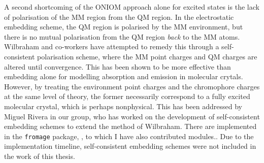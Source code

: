 A second shortcoming of the ONIOM approach alone for excited states is the lack of polarisation of the MM region from the QM region. In the electrostatic embedding scheme, the QM region is polarised by the MM environment, but there is no mutual polarisation from the QM region \textit{back} to the MM atoms. Wilbraham and co-workers have attempted to remedy this through a self-consistent polarisation scheme, where the MM point charges and QM charges are altered until convergence.\cite{Wilbraham2016} This has been shown to be more effective than embedding alone for modelling absorption and emission in molecular crytals.\cite{Presti2017a,Wilbraham2018a} However, by treating the environment point charges and the chromophore charges at the same level of theory, the former necessarily correspond to a fully excited molecular crystal, which is perhaps nonphysical. This has been addressed by Miguel Rivera in our group, who has worked on the development of self-consistent embedding schemes to extend the method of Wilbraham. There are implemented in the \texttt{fromage} package, , to which I have also contributed modules..\cite{Rivera2018,fromage} Due to the implementation timeline, self-consistent embedding schemes were not included in the work of this thesis. 
